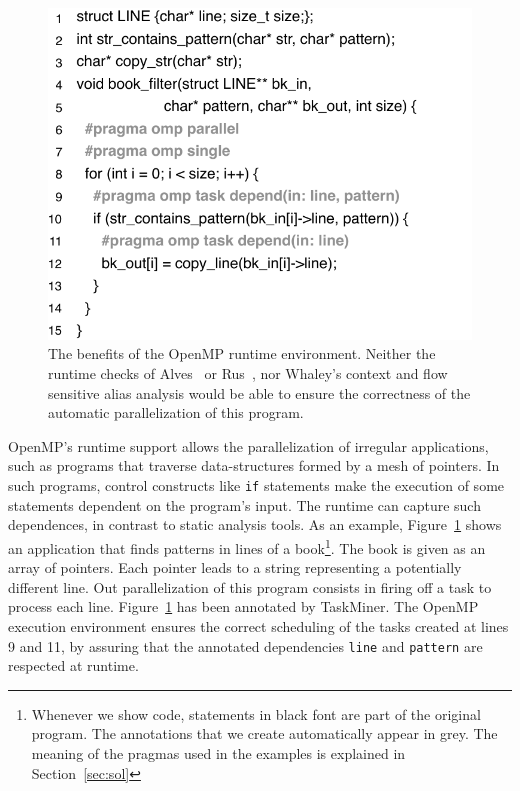 \documentclass[sigplan,10pt,review,anonymous]{acmart}
\newcommand\Taskminer{\mbox{\textsf{TaskMiner}}}
\begin{document}
\begin{figure}[t!]
\begin{center}
\includegraphics[width=1\columnwidth]{images/ex_book_filter}
\caption{The benefits of the OpenMP runtime environment.
Neither the runtime checks of Alves~\cite{Alves15} or Rus~\cite{Rus02}, nor
Whaley's context and flow sensitive alias analysis would be able to ensure the
correctness of the automatic parallelization of this program.}
\label{fig:ex_book_filter}
\end{center}
\end{figure}

OpenMP's runtime support allows the parallelization of irregular applications,
such as programs that traverse data-structures formed by a mesh of pointers.
In such programs, control constructs like {\tt if} statements make the
execution of some statements dependent on the program's input.
The runtime can capture such dependences, in contrast to static analysis tools.
As an example, Figure~\ref{fig:ex_book_filter} shows an application that
finds patterns in lines of a book\footnote{Whenever we show code, statements in
black font are part of the original program.
The annotations that we create automatically appear in grey.
The meaning of the pragmas used in the examples is explained in
Section~\ref{sec:sol}}.
The book is given as an array of pointers.
Each pointer leads to a string representing a potentially different line.
Out parallelization of this program consists in firing off a task
to process each line.
Figure~\ref{fig:ex_book_filter} has been annotated by
\Taskminer.
The OpenMP execution environment ensures the correct scheduling of the tasks
created at lines 9 and 11, by assuring that the annotated dependencies
{\tt line} and {\tt pattern}
are respected at runtime.
\end{document}
